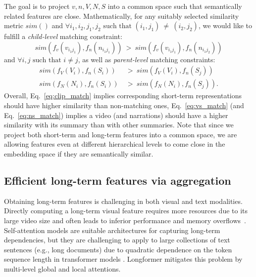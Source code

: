 \documentclass[10pt,twocolumn,letterpaper]{article}
\begin{document}
The goal is to project $v, n, V, N, S$ into a common space 
such that semantically related features are close. Mathematically, for any suitably selected similarity metric $sim()$ and $\forall i_1, i_2, j_1, j_2 \text{~such that~} (i_1,j_1)~\neq~(i_2,j_2)$, we would like to fulfill a {\em child-level} matching constraint: 
\begin{equation}
\label{eq:clip_match}
  sim\left( f_v(v_{i_1j_1}), f_n(n_{i_1j_1})\right)~>~ sim(f_v(v_{i_1j_1}), f_n(n_{i_1j_2}))  
\end{equation}
and $\forall i, j \text{~such that~} i \neq j$, as well as {\em parent-level} matching constraints:
\begin{align}
    sim(f_V(V_i), f_n(S_i))~&>~sim(f_V(V_i), f_n(S_j)) \label{eq:vs_match}\\
    sim(f_N(N_i), f_n(S_i))~&>~sim(f_N(N_i), f_n(S_j)).\label{eq:ns_match}
\end{align}
Overall, Eq.~\ref{eq:clip_match} implies corresponding short-term representations should have higher similarity than non-matching ones, Eq.~\ref{eq:vs_match} (and Eq.~\ref{eq:ns_match}) implies a video (and narrations) should have a higher similarity with its summary than with other summaries. Note that since we project both short-term and long-term features into a common space, we are allowing features even at different hierarchical levels to come close in the embedding space if they are semantically similar.



\subsection{Efficient long-term features via aggregation}
\label{sec:clip-agg}

Obtaining long-term features is challenging in both visual and text modalities. Directly computing a long-term visual feature requires more resources due to its large video size and often leads to inferior performance and memory overflows~\cite{memvit,ltfb,clip-hitchhiker,scsampler}. Self-attention models are suitable architectures for capturing long-term dependencies, but they are challenging to apply to large collections of text sentences (e.g., long documents)
due to quadratic dependence on the token sequence length in transformer models \cite{bert}. Longformer \cite{longformer} mitigates this problem by multi-level global and local attentions. 
\end{document}
